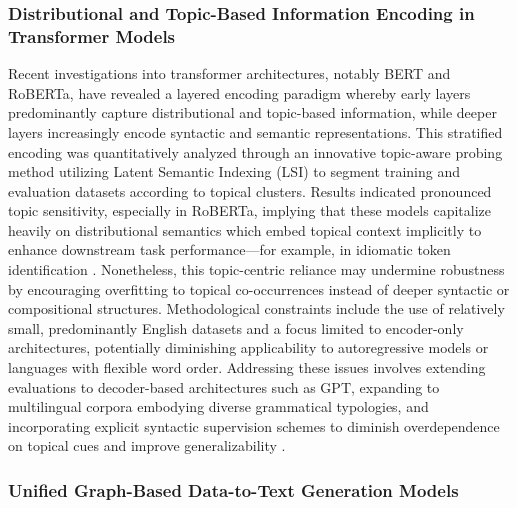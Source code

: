 \subsubsection{Distributional and Topic-Based Information Encoding in Transformer Models}

Recent investigations into transformer architectures, notably BERT and RoBERTa, have revealed a layered encoding paradigm whereby early layers predominantly capture distributional and topic-based information, while deeper layers increasingly encode syntactic and semantic representations. This stratified encoding was quantitatively analyzed through an innovative topic-aware probing method utilizing Latent Semantic Indexing (LSI) to segment training and evaluation datasets according to topical clusters. Results indicated pronounced topic sensitivity, especially in RoBERTa, implying that these models capitalize heavily on distributional semantics which embed topical context implicitly to enhance downstream task performance---for example, in idiomatic token identification \cite{ref44}. Nonetheless, this topic-centric reliance may undermine robustness by encouraging overfitting to topical co-occurrences instead of deeper syntactic or compositional structures. Methodological constraints include the use of relatively small, predominantly English datasets and a focus limited to encoder-only architectures, potentially diminishing applicability to autoregressive models or languages with flexible word order. Addressing these issues involves extending evaluations to decoder-based architectures such as GPT, expanding to multilingual corpora embodying diverse grammatical typologies, and incorporating explicit syntactic supervision schemes to diminish overdependence on topical cues and improve generalizability \cite{ref44}.

\subsubsection{Unified Graph-Based Data-to-Text Generation Models}

